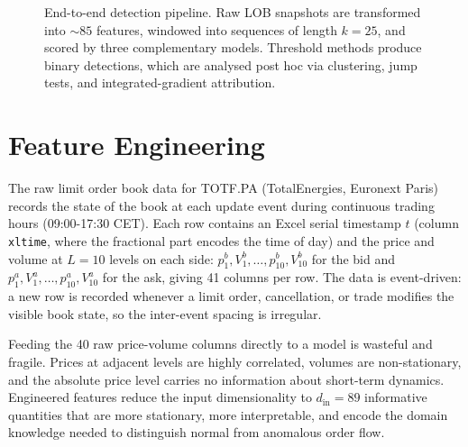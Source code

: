 \documentclass[11pt]{report}
\begin{document}
\begin{figure}[H]
{%
}
\caption{End-to-end detection pipeline. Raw LOB snapshots are transformed into ${\sim}85$ features, windowed into sequences of length $k{=}25$, and scored by three complementary models. Threshold methods produce binary detections, which are analysed post hoc via clustering, jump tests, and integrated-gradient attribution.}
\label{fig:pipeline}
\end{figure}

\section{Feature Engineering}\label{sec:methodology:features}

The raw limit order book data for TOTF.PA (TotalEnergies, Euronext Paris) records the state of the book at each update event during continuous trading hours (09:00-17:30 CET). Each row contains an Excel serial timestamp $t$ (column \texttt{xltime}, where the fractional part encodes the time of day) and the price and volume at $L = 10$ levels on each side: $p^b_1, V^b_1, \ldots, p^b_{10}, V^b_{10}$ for the bid and $p^a_1, V^a_1, \ldots, p^a_{10}, V^a_{10}$ for the ask, giving 41 columns per row. The data is event-driven: a new row is recorded whenever a limit order, cancellation, or trade modifies the visible book state, so the inter-event spacing is irregular.

Feeding the 40 raw price-volume columns directly to a model is wasteful and fragile. Prices at adjacent levels are highly correlated, volumes are non-stationary, and the absolute price level carries no information about short-term dynamics. Engineered features reduce the input dimensionality to $d_{\text{in}} = 89$ informative quantities that are more stationary, more interpretable, and encode the domain knowledge needed to distinguish normal from anomalous order flow.
\end{document}
